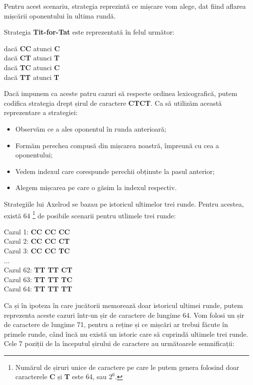Pentru acest scenariu, strategia reprezintă ce mișcare vom alege, dat fiind aflarea mișcării oponentului în ultima rundă.

Strategia \textbf{Tit-for-Tat} este reprezentată în felul următor: 

\begin{center}
	dacă \textbf{CC} atunci \textbf{C}\\
	dacă \textbf{CT} atunci \textbf{T}\\
	dacă \textbf{TC} atunci \textbf{C}\\
	dacă \textbf{TT} atunci \textbf{T}\\
\end{center}

Dacă impunem ca aceste patru cazuri să respecte ordinea lexicografică, putem codifica strategia drept șirul de caractere \textbf{CTCT}. Ca să utilizăm această reprezentare a strategiei:\\
\begin{itemize}
	\item Observăm ce a ales oponentul în runda anterioară;
	\item Formăm perechea compusă din mișcarea noastră, împreună cu cea a oponentului;
	\item Vedem indexul care corespunde perechii obținute la pasul anterior;
	\item Alegem mișcarea pe care o găsim la indexul respectiv.
\end{itemize}

Strategiile lui Axelrod se bazau pe istoricul ultimelor trei runde. Pentru acestea, există 64 \footnote{Numărul de șiruri unice de caractere pe care le putem genera folosind doar caracterele \textbf{C} și \textbf{T} este 64, sau $2^6$.} de posibile scenarii pentru utlimele trei runde: 

\begin{center}
	Cazul 1: \textbf{CC CC CC}\\
	Cazul 2: \textbf{CC CC CT}\\
	Cazul 3: \textbf{CC CC TC}\\
	...
	\\
	Cazul 62: \textbf{TT TT CT}\\
	Cazul 63: \textbf{TT TT TC}\\
	Cazul 64: \textbf{TT TT TT}\\
\end{center}

Ca și în  ipoteza în care jucătorii memorează doar istoricul ultimei runde, putem reprezenta aceste cazuri într-un șir de caractere de lungime 64. Vom folosi un șir de caractere de lungime 71, pentru a reține și ce mișcări ar trebui făcute în primele runde, când încă nu există un istoric care să cuprindă ultimele trei runde. Cele 7 poziții de la începutul șirului de caractere au următoarele semnificații:\\

